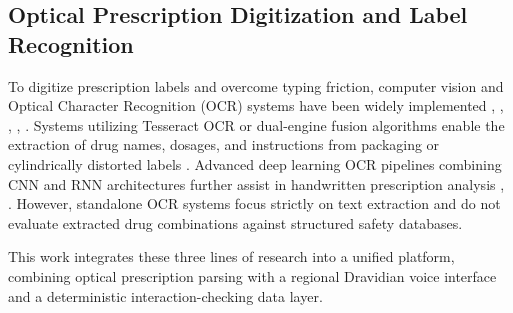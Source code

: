 \subsection{Optical Prescription Digitization and Label Recognition}
To digitize prescription labels and overcome typing friction, computer vision and Optical Character Recognition (OCR) systems have been widely implemented \cite{b3}, \cite{b4}, \cite{b11}, \cite{b13}, \cite{b16}. Systems utilizing Tesseract OCR \cite{b4} or dual-engine fusion algorithms \cite{b13} enable the extraction of drug names, dosages, and instructions from packaging or cylindrically distorted labels \cite{b11}. Advanced deep learning OCR pipelines combining CNN and RNN architectures further assist in handwritten prescription analysis \cite{b3}, \cite{b16}. However, standalone OCR systems focus strictly on text extraction and do not evaluate extracted drug combinations against structured safety databases.

This work integrates these three lines of research into a unified platform, combining optical prescription parsing with a regional Dravidian voice interface and a deterministic interaction-checking data layer.

